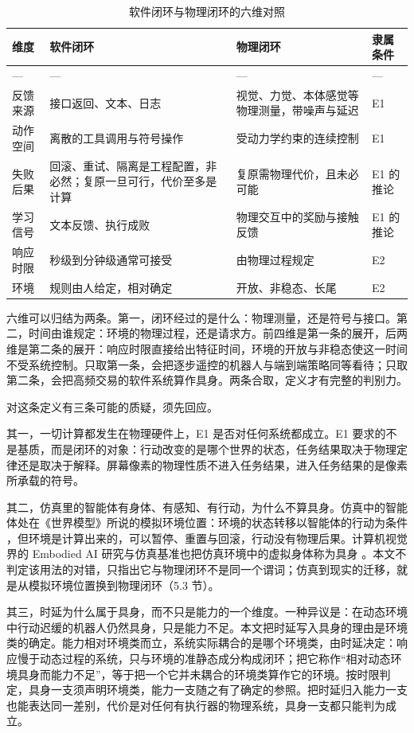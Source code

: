 \documentclass[10pt,fontset=fandol]{ctexart}
\begin{document}
\begin{table}[htbp]
\centering
\caption{软件闭环与物理闭环的六维对照}
\small
\begin{tabularx}{\textwidth}{>{\raggedright\arraybackslash}p{1.9cm}YY>{\centering\arraybackslash}p{1.7cm}}
\toprule
维度 & 软件闭环 & 物理闭环 & 隶属条件 \\
\midrule
--- & --- & --- & --- \\
反馈来源 & 接口返回、文本、日志 & 视觉、力觉、本体感觉等物理测量，带噪声与延迟 & E1 \\
动作空间 & 离散的工具调用与符号操作 & 受动力学约束的连续控制 & E1 \\
失败后果 & 回滚、重试、隔离是工程配置，非必然；复原一旦可行，代价至多是计算 & 复原需物理代价，且未必可能 & E1 的推论 \\
学习信号 & 文本反馈、执行成败 & 物理交互中的奖励与接触反馈 & E1 的推论 \\
响应时限 & 秒级到分钟级通常可接受 & 由物理过程规定 & E2 \\
环境 & 规则由人给定，相对确定 & 开放、非稳态、长尾 & E2 \\
\bottomrule
\end{tabularx}
\end{table}
六维可以归结为两条。第一，闭环经过的是什么：物理测量，还是符号与接口。第二，时间由谁规定：环境的物理过程，还是请求方。前四维是第一条的展开，后两维是第二条的展开：响应时限直接给出特征时间，环境的开放与非稳态使这一时间不受系统控制。只取第一条，会把逐步遥控的机器人与端到端策略同等看待；只取第二条，会把高频交易的软件系统算作具身。两条合取，定义才有完整的判别力。

对这条定义有三条可能的质疑，须先回应。

其一，一切计算都发生在物理硬件上，E1 是否对任何系统都成立。E1 要求的不是基质，而是闭环的对象：行动改变的是哪个世界的状态，任务结果取决于物理定律还是取决于解释。屏幕像素的物理性质不进入任务结果，进入任务结果的是像素所承载的符号。

其二，仿真里的智能体有身体、有感知、有行动，为什么不算具身。仿真中的智能体处在《世界模型》所说的模拟环境位置：环境的状态转移以智能体的行动为条件 \cite{yu2026wm}，但环境是计算出来的，可以暂停、重置与回滚，行动没有物理后果。计算机视觉界的 Embodied AI 研究与仿真基准也把仿真环境中的虚拟身体称为具身 \cite{savva2019,yang2025embodiedbench,hellstrom2024}。本文不判定该用法的对错，只指出它与物理闭环不是同一个谓词；仿真到现实的迁移，就是从模拟环境位置换到物理闭环（5.3 节）。

其三，时延为什么属于具身，而不只是能力的一个维度。一种异议是：在动态环境中行动迟缓的机器人仍然具身，只是能力不足。本文把时延写入具身的理由是环境类的确定。能力相对环境类而立，系统实际耦合的是哪个环境类，由时延决定：响应慢于动态过程的系统，只与环境的准静态成分构成闭环；把它称作“相对动态环境具身而能力不足”，等于把一个它并未耦合的环境类算作它的环境。按时限判定，具身一支须声明环境类，能力一支随之有了确定的参照。把时延归入能力一支也能表达同一差别，代价是对任何有执行器的物理系统，具身一支都只能判为成立。
\end{document}
